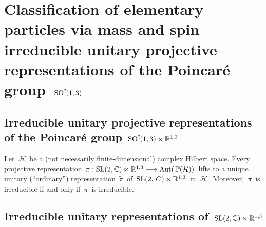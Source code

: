 

\chapter{Classification of elementary particles via mass and spin --
irreducible unitary projective representations of the Poincaré group \,$\textnormal{SO}^{\uparrow\!}(1,3)$}
\setcounter{theorem}{0}
\setcounter{equation}{0}


\renewcommand{\theenumi}{\roman{enumi}}
\renewcommand{\labelenumi}{\textnormal{(\theenumi)}$\;\;$}



\vskip 1.0cm

\vskip 1.0cm

\vskip 1.0cm

\vskip 1.0cm

%


\vskip 1.0cm
\section{Irreducible unitary projective representations of the Poincaré group \,$\textnormal{SO}^{\uparrow\!}(1,3) \ltimes \mathbb{R}^{1,3}$}

\vskip 0.3cm
\begin{theorem}
\mbox{}
\vskip 0.1cm
\noindent
Let \,$\mathcal{H}$\, be a (not necessarily finite-dimensional) complex Hilbert space.
Every projective representation
\,$\pi : \textnormal{SL}(2,\mathbb{C}) \ltimes \mathbb{R}^{1,3} \longrightarrow \textnormal{Aut}\!\left(\,\mathbb{P}(\mathcal{H})\right)$\,
lifts to a unique unitary (``ordinary'') representation
\,$\widetilde{\pi}$\, of \,$\textnormal{SL}(2,\,C) \ltimes \mathbb{R}^{1,3}$\,
in \,$\mathcal{H}$.\,
Moreover, \,$\pi$\, is irreducible if and only if \,$\widetilde{\pi}$\, is irreducible.
\end{theorem}


\vskip 1.0cm
\section{Irreducible unitary representations of \,$\textnormal{SL}(2,\mathbb{C}) \ltimes \mathbb{R}^{1,3}$}

